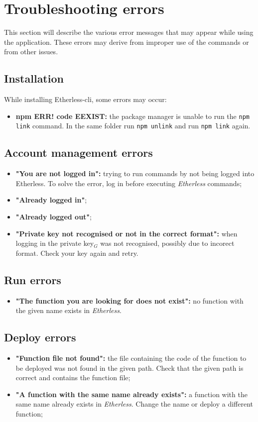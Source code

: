 \section{Troubleshooting errors}
  This section will describe the various error messages that may appear while using the application. These errors may derive from improper use of the commands or from other issues.
  \subsection{Installation}
    While installing Etherless-cli, some errors may occur:
    \begin{itemize}
      \item \textbf{npm ERR! code EEXIST:} the package manager is unable to run the \texttt{npm link} command. In the same folder run \texttt{npm unlink} and run \texttt{npm link} again.
    \end{itemize}
  \subsection{Account management errors}
    \begin{itemize}
      \item \textbf{"You are not logged in":} trying to run commands by not being logged into Etherless. To solve the error, log in before executing \textit{Etherless} commands;
      \item \textbf{"Already logged in"};
      \item \textbf{"Already logged out"};
      \item \textbf{"Private key not recognised or not in the correct format":} when logging in the private key$_{G}$ was not recognised, possibly due to incorect format. Check your key again and retry.
    \end{itemize}
  \subsection{Run errors}
  \begin{itemize}
    \item \textbf{"The function you are looking for does not exist":} no function with the given name exists in \textit{Etherless}.
  \end{itemize}
  \subsection{Deploy errors}
  \begin{itemize}
    \item \textbf{"Function file not found":} the file containing the code of the function to be deployed was not found in the given path. Check that the given path is correct and contains the function file;
    \item \textbf{"A function with the same name already exists":} a function with the same name already exists in \textit{Etherless}. Change the name or deploy a different function;
  \end{itemize}
